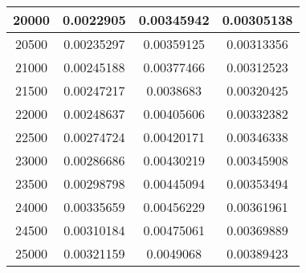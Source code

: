 \documentclass{article}
\begin{document}
\begin{longtable}{|c|c|c|c|}
		    20000  &  0.0022905	    &   0.00345942	 &  0.00305138  \\ \hline
		    20500  &  0.00235297    & 	0.00359125	 &  0.00313356  \\ \hline
		    21000  &  0.00245188    & 	0.00377466	 &  0.00312523  \\ \hline
		    21500  &  0.00247217    & 	0.0038683	 &  0.00320425  \\ \hline
		    22000  &  0.00248637    & 	0.00405606	 &  0.00332382  \\ \hline
		    22500  &  0.00274724    & 	0.00420171	 &  0.00346338  \\ \hline
		    23000  &  0.00286686    & 	0.00430219	 &  0.00345908  \\ \hline
	     	23500  &  0.00298798    & 	0.00445094	 &  0.00353494  \\ \hline
		    24000  &  0.00335659    & 	0.00456229	 &  0.00361961  \\ \hline
		    24500  &  0.00310184    & 	0.00475061	 &  0.00369889  \\ \hline
		    25000  &  0.00321159    & 	0.0049068	 &  0.00389423  \\ \hline
		\end{longtable}
\end{document}
